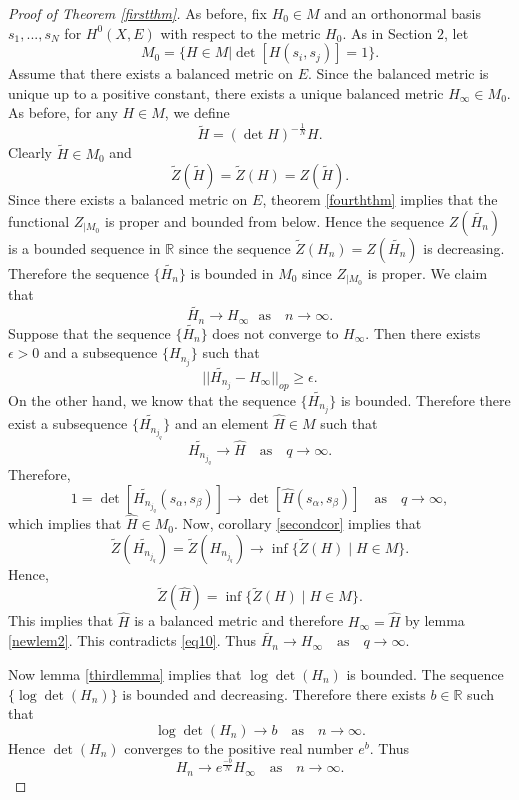 \documentclass[12pt,oneside,notitlepage]{amsart}
\theoremstyle{definition}
\theoremstyle{remark}
\numberwithin{equation}{section}
\begin{document}
\begin{proof}[Proof of Theorem \ref{firstthm}]

As before, fix $H_{0} \in M$ and an orthonormal basis
$s_{1},...,s_{N}$ for $H^0(X,E)$ with respect to the metric
$H_{0}$. As in Section $2$, let $$M_{0}=\big \{ H \in M  | \det
[H(s_{i},s_{j})]=1 \big \}.$$ Assume that there exists a balanced
metric on $E$. Since the balanced metric is unique up to a
positive constant, there exists a unique balanced metric
$H_{\infty} \in M_{0}.$ As before, for  any $H \in M$, we define
$$ \widetilde{H}= (\det H)^{-\frac{1}{N}}H.$$ Clearly
$\widetilde{H} \in M_{0}$ and
$$\widetilde{Z}(\widetilde{H})=\widetilde{Z}(H)=Z(\widetilde{H}).$$
Since there exists a balanced metric on $E$, theorem
\ref{fourththm} implies that the functional $Z_{| M_{0}}$ is
proper and bounded from below. Hence the sequence
$Z(\widetilde{H_{n}})$ is a bounded sequence in $\mathbb{R}$ since
the sequence $\widetilde{Z}(H_{n})=Z(\widetilde{H_{n}})$ is
decreasing. Therefore the sequence $\{\widetilde{H_{n}}\}$ is
bounded in $M_{0}$ since $Z_{| M_{0}}$ is proper. We claim that
$$\widetilde{H_{n}}\longrightarrow H_{\infty}   \,\,\,\, \textrm{
as    }  \,\,\,\, n\rightarrow \infty. $$ Suppose that the
sequence $\{\widetilde{H_{n}}\}$ does not converge to
$H_{\infty}$. Then there exists $\epsilon > 0$ and a subsequence
$\{H_{n_{j}}\}$ such that
\begin{equation}\label{eq10}||\widetilde{H_{n_{j}}}- H_{\infty}||_{op}\geq \epsilon.\end{equation}
On the other hand, we know that the sequence
$\{\widetilde{H_{n_{j}}}\}$ is bounded. Therefore there exist a
subsequence $\{\widetilde{H_{n_{j_{q}}}}\}$  and an element
$\widehat{H} \in M $ such that
$$\widetilde{H_{n_{j_{q}}}} \rightarrow \widehat{H}\,\,\,\, \textrm{    as    }  \,\,\,\,    q  \rightarrow \infty.$$
Therefore,
$$1=\det[\widetilde{H_{n_{j_{q}}}}(s_{\alpha}, s_{\beta})] \rightarrow \det[\widehat{H}(s_{\alpha}, s_{\beta})]\,\,\,\, \textrm{    as    }  \,\,\,\, q  \rightarrow \infty,$$
which implies that $\widehat{H} \in M_{0}$.  Now, corollary
\ref{secondcor} implies that
$$\widetilde{Z}(\widetilde{H_{n_{j_{q}}}})=\widetilde{Z}(H_{n_{j_{q}}})
\longrightarrow \inf \{\widetilde{Z}(H)\mid H \in M\}. $$ Hence,
$$\widetilde{Z}(\widehat{H})=\inf \{\widetilde{Z}(H)\mid H \in
M\}.$$ This implies that $\widehat{H}$ is a balanced metric and
therefore $H_{\infty}=\widehat{H}$ by lemma \ref{newlem2}. This
contradicts \eqref{eq10}. Thus $\widetilde{H_{n}}\longrightarrow
H_{\infty} \,\,\,\, \textrm{    as    }  \,\,\,\, q\rightarrow
\infty$.

Now lemma \ref{thirdlemma} implies that $\log \det(H_{n})$ is
bounded. The sequence $\{\log \det(H_{n})\}$ is bounded and
decreasing. Therefore there exists $b \in \mathbb{R}$ such that
$$\log \det(H_{n}) \rightarrow b  \,\,\,\, \textrm{    as    }  \,\,\,\,  n \rightarrow \infty.$$ Hence $\det(H_{n})$ converges to the positive real number $e^b$. Thus $$H_{n}\longrightarrow
e^{\frac{-b}{N}} H_{\infty}    \,\,\,\, \textrm{    as    }
\,\,\,\, n\rightarrow \infty.$$

\end{proof}
\end{document}
